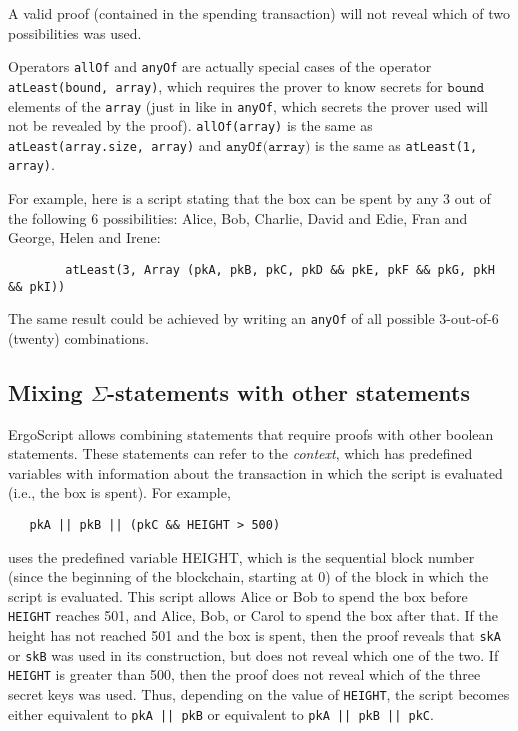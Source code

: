 \documentclass[11pt]{article}
\newcommand{\authnote}[2]{\marginpar{\parbox{\marginparwidth}{\tiny %
  \textsf{#1 {\textcolor{blue}{notes: #2}}}}}%
  \textcolor{blue}{\textbf{\dag}}}
\newcommand{\authnote}[2]{
  \textsf{#1 \textcolor{blue}{: #2}}}
\newcommand{\authnote}[2]{}
\newcommand{\lnote}[1]{{\authnote{\textcolor{orange}{Leo notes}}{#1}}}
\newcommand{\langname}{ErgoScript\xspace}
\begin{document}
A valid proof (contained in the spending transaction) will not reveal which of two possibilities was used.

Operators \texttt{allOf} and \texttt{anyOf} are actually special cases of the operator \texttt{atLeast(bound, array)}, which requires the prover to know secrets for $\texttt{bound}$ elements of the \texttt{array} (just in like in \texttt{anyOf}, which secrets the prover used will not be revealed by the proof). \texttt{allOf(array)} is the same as \texttt{atLeast(array.size, array)} and $\texttt{anyOf(array)}$ is the same as \texttt{atLeast(1, array)}.

For example, here is a script stating that the box can be spent by any 3 out of the following 6 possibilities: Alice, Bob, Charlie, David and Edie, Fran and George, Helen and Irene:
\begin{verbatim}
        atLeast(3, Array (pkA, pkB, pkC, pkD && pkE, pkF && pkG, pkH && pkI))
\end{verbatim}
The same result could be achieved by writing an \texttt{anyOf} of all possible 3-out-of-6 (twenty) combinations.


\lnote{should probably do a diffie-hellman example, and maybe another one below with getting some of the DH values from a context. E.g., $g_1$ is just $g$, $g_2$ is $pk_A$, $h_1$ is a hash of a message in a context, and $h_2$ is from the context. }

\subsection{Mixing $\Sigma$-statements with other statements}
\langname allows combining statements that require proofs with other boolean statements. These statements can refer to the \emph{context}, which has predefined variables with information about the transaction in which the script is evaluated (i.e., the box is spent). For example,

\begin{verbatim}
   pkA || pkB || (pkC && HEIGHT > 500)
\end{verbatim}
uses the predefined variable HEIGHT, which is the sequential block number (since the beginning of the blockchain, starting at 0)  
of the block in which the script is evaluated.
This script allows Alice or Bob to spend the box before \texttt{HEIGHT} reaches 501, and Alice, Bob, or Carol to spend the box after that. If the height has not reached 501 and the box is spent, then the proof reveals that \texttt{skA} or \texttt{skB} was used in its construction, but does not reveal which one of the two. If \texttt{HEIGHT} is greater than 500, then the proof does not reveal which of the three secret keys was used. Thus, depending on the value of \texttt{HEIGHT}, the script becomes either equivalent to \texttt{pkA || pkB} or equivalent to \texttt{pkA || pkB || pkC}.
\end{document}
